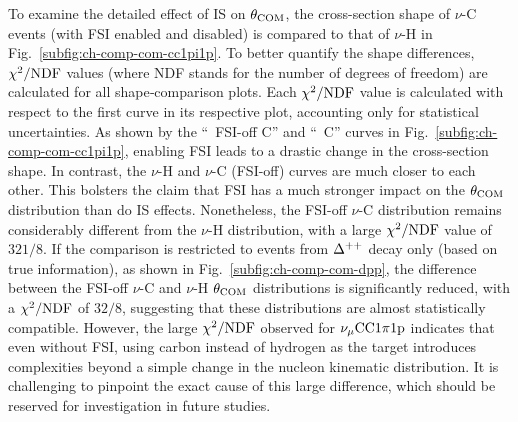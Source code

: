      To examine the detailed effect of IS on $\theta_{\textrm{COM}}$, the cross-section shape of $\nu$-C events (with FSI enabled and disabled) is compared to that of $\nu$-H in Fig.~\ref{subfig:ch-comp-com-cc1pi1p}.
     To better quantify the shape differences, $\chi^2/{\textrm{NDF}}$ values (where NDF stands for the number of degrees of freedom) are calculated for all shape‐comparison plots.
     Each $\chi^2/{\textrm{NDF}}$ value is calculated with respect to the first curve in its respective plot, accounting only for statistical uncertainties.
     As shown by the ``\geta\ FSI-off C'' and ``\geta\ C'' curves in Fig.~\ref{subfig:ch-comp-com-cc1pi1p}, enabling FSI leads to a drastic change in the cross-section shape.
     In contrast, the $\nu$-H and $\nu$-C (FSI-off) curves are much closer to each other.
     This bolsters the claim that FSI has a much stronger impact on the $\theta_{\textrm{COM}}$ distribution than do IS effects.
     Nonetheless, the FSI-off $\nu$-C distribution remains considerably different from the $\nu$-H distribution, with a large $\chi^2/{\textrm{NDF}}$ value of $321/8$.
     If the comparison is restricted to events from $\Delta^{++}$ decay only (based on true information), as shown in Fig.~\ref{subfig:ch-comp-com-dpp}, the difference between the FSI-off $\nu$-C and $\nu$-H $\theta_{\textrm{COM}}$ distributions is significantly reduced, with a $\chi^2/{\textrm{NDF}}$ of $32/8$, suggesting that these distributions are almost statistically compatible.
     However, the large $\chi^2/{\textrm{NDF}}$ observed for $\nu_{\mu}\textrm{CC}1\pi1\textrm{p}$ indicates that even without FSI, using carbon instead of hydrogen as the target introduces complexities beyond a simple change in the nucleon kinematic distribution.
     It is challenging to pinpoint the exact cause of this large difference, which should be reserved for investigation in future studies.

